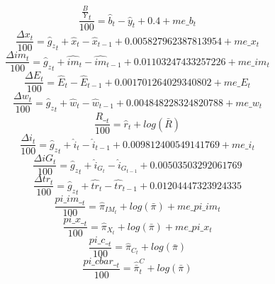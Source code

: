 \begin{dmath}
\frac{{\frac{B}{Y}_{t}}}{100}={\hat{b}_{t}}-{\hat{y}_{t}}+0.4+{me\_b_{t}}
\end{dmath}
\begin{dmath}
\frac{{\Delta{x}_{t}}}{100}={{\hat{g}_z}_{t}}+{\hat{x}_{t}}-{\hat{x}_{t-1}}+0.005827962387813954+{me\_x_{t}}
\end{dmath}
\begin{dmath}
\frac{{\Delta{im}_{t}}}{100}={{\hat{g}_z}_{t}}+{\hat{im}_{t}}-{\hat{im}_{t-1}}+0.01103247433257226+{me\_im_{t}}
\end{dmath}
\begin{dmath}
\frac{{\Delta{E}_{t}}}{100}={\hat{E}_{t}}-{\hat{E}_{t-1}}+0.001701264029340802+{me\_E_{t}}
\end{dmath}
\begin{dmath}
\frac{{\Delta{w}_{t}}}{100}={{\hat{g}_z}_{t}}+{\hat{w}_{t}}-{\hat{w}_{t-1}}+0.004848228324820788+{me\_w_{t}}
\end{dmath}
\begin{dmath}
\frac{{R\__{t}}}{100}={\hat{r}_{t}}+log\left({\bar{R}}\right)
\end{dmath}
\begin{dmath}
\frac{{\Delta{i}_{t}}}{100}={{\hat{g}_z}_{t}}+{\hat{i}_{t}}-{\hat{i}_{t-1}}+0.009812400549141769+{me\_i_{t}}
\end{dmath}
\begin{dmath}
\frac{{\Delta{iG}_{t}}}{100}={{\hat{g}_z}_{t}}+{\hat{i}_G_{t}}-{\hat{i}_G_{t-1}}+0.00503503292061769
\end{dmath}
\begin{dmath}
\frac{{\Delta{tr}_{t}}}{100}={{\hat{g}_z}_{t}}+{\hat{tr}_{t}}-{\hat{tr}_{t-1}}+0.01204447323924335
\end{dmath}
\begin{dmath}
\frac{{pi\_im\__{t}}}{100}={\hat{\pi}_{IM}_{t}}+log\left({\bar{\pi}}\right)+{me\_pi\_im_{t}}
\end{dmath}
\begin{dmath}
\frac{{pi\_x\__{t}}}{100}={\hat{\pi}_{X}_{t}}+log\left({\bar{\pi}}\right)+{me\_pi\_x_{t}}
\end{dmath}
\begin{dmath}
\frac{{pi\_c\__{t}}}{100}={\hat{\pi}_{C}_{t}}+log\left({\bar{\pi}}\right)
\end{dmath}
\begin{dmath}
\frac{{pi\_cbar\__{t}}}{100}={\hat{\bar{\pi}}^C_{t}}+log\left({\bar{\pi}}\right)
\end{dmath}

